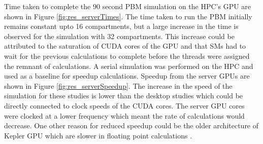 \documentclass[preprint,10pt,authoryear,review]{elsarticle}
\begin{document}
\begin{linenumbers}
Time taken to complete the $90$ second PBM simulation on the HPC's GPU are shown in 
Figure \ref{fig:res_serverTimes}. The time taken to run the PBM initially remains 
constant upto 16 compartments, but a large increase in the time is observed for the 
simulation with 32 compartments. This increase could be attributed to the saturation 
of CUDA cores of the GPU and that SMs had to wait for the previous calculations to 
complete before the threads were assigned the remnant of calculations. A serial 
simulation was performed on the HPC and used as a baseline for speedup calculations. 
Speedup from the server GPUs are shown in Figure \ref{fig:res_serverSpeedup}. The 
increase in the speed of the simulation for these studies is lower than the desktop 
studies which could be directly connected to clock speeds of the CUDA cores. The 
server GPU cores were clocked at a lower frequency which meant the rate of calculations 
would decrease. One other reason for reduced speedup could be the older architecture 
of Kepler GPU which are slower in floating point calculations \citep{Pascal2016}.




\end{linenumbers}
\end{document}

